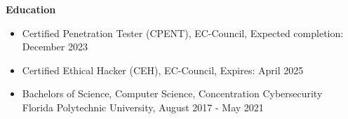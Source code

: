\documentclass[12pt,a4paper]{article}
\begin{document}
    
    


{}\textbf{Education}
\begin{itemize}
    \item Certified Penetration Tester (CPENT), EC-Council, Expected completion: December 2023
    \item Certified Ethical Hacker (CEH), EC-Council, Expires: April 2025
    \item Bachelors of Science, Computer Science, Concentration Cybersecurity\\Florida Polytechnic University, August 2017 - May 2021
\end{itemize}



\end{document}
